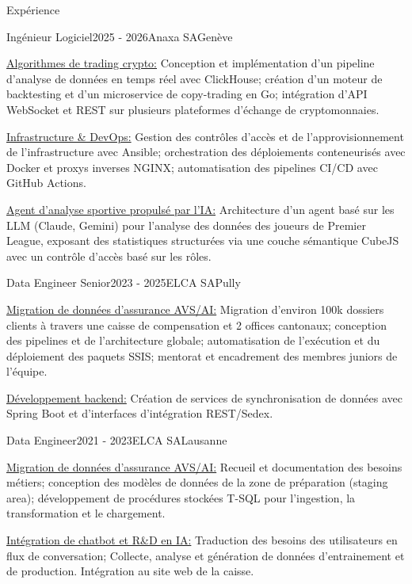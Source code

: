 \documentclass[
	a4paper, %
	10pt, %
]{resume} %
\newcommand{\lead}[1]{{\underline{#1}}}
\begin{document}
\begin{rSection}{Expérience}

	\begin{rSubsection}{Ingénieur Logiciel}{2025 - 2026}{Anaxa SA}{Genève}
		\item \lead{Algorithmes de trading crypto:} Conception et implémentation d'un pipeline d'analyse de données en temps réel avec ClickHouse; création d'un moteur de backtesting et d'un microservice de copy-trading en Go; intégration d'API WebSocket et REST sur plusieurs plateformes d'échange de cryptomonnaies.
		\item \lead{Infrastructure \& DevOps:} Gestion des contrôles d'accès et de l'approvisionnement de l'infrastructure avec Ansible; orchestration des déploiements conteneurisés avec Docker et proxys inverses NGINX; automatisation des pipelines CI/CD avec GitHub Actions.
		\item \lead{Agent d'analyse sportive propulsé par l'IA:} Architecture d'un agent basé sur les LLM (Claude, Gemini) pour l'analyse des données des joueurs de Premier League, exposant des statistiques structurées via une couche sémantique CubeJS avec un contrôle d'accès basé sur les rôles.
	\end{rSubsection}

	\begin{rSubsection}{Data Engineer Senior}{2023 - 2025}{ELCA SA}{Pully}
		\item \lead{Migration de données d'assurance AVS/AI:} Migration d'environ 100k dossiers clients à travers une caisse de compensation et 2 offices cantonaux; conception des pipelines et de l'architecture globale; automatisation de l'exécution et du déploiement des paquets SSIS; mentorat et encadrement des membres juniors de l'équipe.
		\item \lead{Développement backend:} Création de services de synchronisation de données avec Spring Boot et d'interfaces d'intégration REST/Sedex.
	\end{rSubsection}


	\begin{rSubsection}{Data Engineer}{2021 - 2023}{ELCA SA}{Lausanne}
		\item \lead{Migration de données d'assurance AVS/AI:} Recueil et documentation des besoins métiers; conception des modèles de données de la zone de préparation (staging area); développement de procédures stockées T-SQL pour l'ingestion, la transformation et le chargement.
		\item \lead{Intégration de chatbot et R\&D en IA:} Traduction des besoins des utilisateurs en flux de conversation; Collecte, analyse et génération de données d'entrainement et de production. Intégration au site web de la caisse.
	\end{rSubsection}


\end{rSection}
\end{document}
